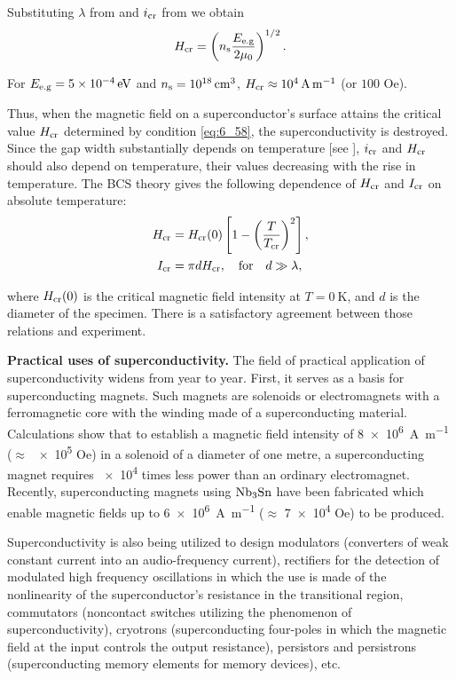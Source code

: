 \noindent
Substituting $\lambda$ from  and $i_{\text{cr}}$ from  we obtain
\begin{equation}\label{eq:6_58}
	H_{\text{cr}} = \left(n_{\text{s}} \frac{E_{\text{e.g}}}{2 \mu_0}\right)^{1/2}.
\end{equation}

\noindent
For $E_{\text{e.g}}=\SI{5e-4}{\electronvolt}$ and $n_{\text{s}}=\SI{e18}{\centi\metre\cubed}$, $H_{\text{cr}}\approx\SI{e4}{\ampere\per\metre}$ (or $100$ Oe).

Thus, when the magnetic field on a superconductor's surface attains the critical value $H_{\text{cr}}$ determined by condition \eqref{eq:6_58}, the superconductivity is destroyed. Since the gap width substantially depends on temperature [see ], $i_{\text{cr}}$ and $H_{\text{cr}}$ should also depend on temperature, their values decreasing with the rise in temperature. The BCS theory gives the following dependence of $H_{\text{cr}}$ and $I_{\text{cr}}$ on absolute temperature:
\begin{align}
	H_{\text{cr}} &= H_{\text{cr}}(0) \left[1 - \left(\frac{T}{T_{\text{cr}}}\right)^2\right], \label{eq:6_59}\\
	I_{\text{cr}} &= \pi d H_{\text{cr}},\quad \text{for}\quad d\gg\lambda, \label{eq:6_60}
\end{align}

\noindent
where $H_{\text{cr}}(0)$ is the critical magnetic field intensity at $T=\SI{0}{\kelvin}$, and $d$ is the diameter of the specimen. There is a satisfactory agreement between those relations and experiment.

\textbf{Practical uses of superconductivity.} The field of practical application of superconductivity widens from year to year. First, it serves as a basis for superconducting magnets. Such magnets are solenoids or electromagnets with a ferromagnetic core with the winding made of a superconducting material. Calculations show that to establish a magnetic field intensity of \SI{8e6}{\ampere\per\metre} ($\approx$ \num{e5} Oe) in a solenoid of a diameter of one metre, a superconducting magnet requires \num{e4} times less power than an ordinary electromagnet. Recently, superconducting magnets using $\ce{Nb3Sn}$ have been fabricated which enable magnetic fields up to \SI{6e6}{\ampere\per\metre} ($\approx$ \num{7e4} Oe) to be produced.

Superconductivity is also being utilized to design modulators (converters of weak constant current into an audio-frequency current), rectifiers for the detection of modulated high frequency oscillations in which the use is made of the nonlinearity of the superconductor's resistance in the transitional region, commutators (noncontact switches utilizing the phenomenon of superconductivity), cryotrons (superconducting four-poles in which the magnetic field at the input controls the output resistance), persistors and persistrons (superconducting memory elements for memory devices), etc.

